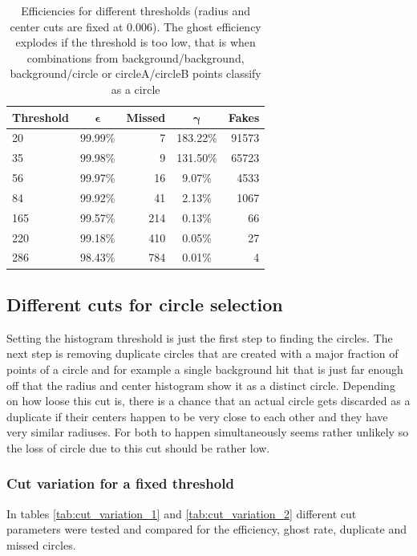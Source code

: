 \documentclass[11pt,twoside]{scrreprt}
\begin{document}
\begin{table}[tb]
  \caption[Efficiencies for different thresholds]{Efficiencies for different thresholds (radius and center cuts are fixed at $0.006$). The ghost efficiency explodes if the threshold is too low, that is when combinations
  from background/background, background/circle or circleA/circleB points classify as a circle}
  \label{tab:threshold_cuts}
  \centering

  \begin{tabular}{lcrcr}
  \toprule
  \textbf{Threshold} & $\boldsymbol{\epsilon}$ & \textbf{Missed} & $\boldsymbol{\gamma}$ & \textbf{Fakes} \\
  \midrule
  20  & 99.99\% & 7 & 183.22\% & 91573 \\
  35  & 99.98\% & 9 & 131.50\% & 65723 \\
  56  & 99.97\% & 16 & 9.07\% & 4533 \\
  84  & 99.92\% & 41 & 2.13\% & 1067 \\
  165 & 99.57\% & 214 & 0.13\% & 66 \\
  220 & 99.18\% & 410 & 0.05\% & 27 \\
  286 & 98.43\% & 784 & 0.01\% & 4 \\
  \bottomrule
  \end{tabular}
\end{table}


\subsection{Different cuts for circle selection} %
\label{sub:different_cuts_for_circle_selection}
Setting the histogram threshold is just the first step to finding the circles. The next step is removing duplicate circles that
are created with a major fraction of points of a circle and for example a single background hit that is just far enough off
that the radius and center histogram show it as a distinct circle. Depending on how loose this cut is, there is a chance that an actual
circle gets discarded as a duplicate if their centers happen to be very close to each other and they have very similar radiuses. For
both to happen simultaneously seems rather unlikely so the loss of circle due to this cut should be rather low.

\subsubsection{Cut variation for a fixed threshold} %
In tables \ref{tab:cut_variation_1} and \ref{tab:cut_variation_2} different cut parameters were tested
and compared for the efficiency, ghost rate, duplicate and missed circles.
\end{document}
